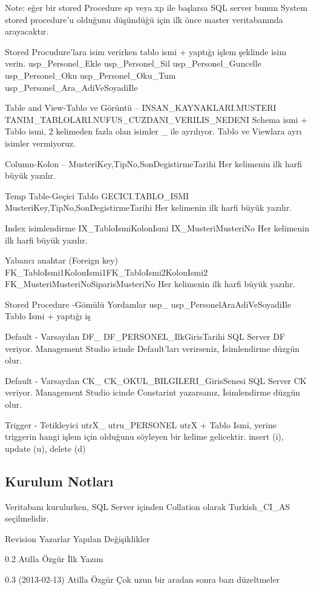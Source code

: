 \documentclass[10pt,a4paper,draft]{article}
\begin{document}
  
  Note: eğer bir 
  stored Procedure sp veya xp ile başlarsa SQL server 			bunun System stored 
  procedure'u olduğunu düşündüğü için ilk önce master veritabanında arayacaktır. 
  
  
  Stored Procudure'lara isim verirken tablo ismi + yaptığı işlem şeklinde 
  isim verin.
		usp\_Personel\_Ekle			usp\_Personel\_Sil			 
		usp\_Personel\_Guncelle		usp\_Personel\_Oku			 
		usp\_Personel\_Oku\_Tum		usp\_Personel\_Ara\_AdiVeSoyadiIle
  
     Table and View-Tablo ve Görüntü 
     -- 
    INSAN\_KAYNAKLARI.MUSTERI 
      			TANIM\_TABLOLARI.NUFUS\_CUZDANI\_VERILIS\_NEDENI 
    Schema ismi + Tablo ismi, 2 kelimeden fazla olan isimler \_ ile 
      ayrılıyor. Tablo ve Viewlara ayrı isimler vermiyoruz.		  
  
     Column-Kolon 
     -- 
    MusteriKey,TipNo,SonDegistirmeTarihi 
    Her kelimenin ilk harfi büyük yazılır. 
  
     Temp Table-Geçici Tablo 
     GECICI.TABLO\_ISMI 
    MusteriKey,TipNo,SonDegistirmeTarihi 
    Her kelimenin ilk harfi büyük yazılır. 
  
     Index isimlendirme 
     IX\_TabloIsmiKolonIsmi 
     IX\_MusteriMusteriNo 
    Her kelimenin ilk harfi büyük yazılır. 
  
     Yabancı anahtar (Foreign key) 
     FK\_TabloIsmi1KolonIsmi1FK\_TabloIsmi2KolonIsmi2 
     FK\_MusteriMusteriNoSiparisMusteriNo 
    Her kelimenin ilk harfi büyük yazılır. 
  
     Stored Procedure -Gömülü Yordamlar 
     usp\_ 
     usp\_PersonelAraAdiVeSoyadiIle 
     Tablo Ismi + yaptığı iş 		  
  
    Default - Varsayılan 
     DF\_ 
     DF\_PERSONEL\_IlkGirisTarihi 
     SQL Server DF veriyor. Management Studio icinde Default'ları 
      verirseniz, İsimlendirme düzgün olur. 		  
  
     Default - Varsayılan 
     CK\_ 
     CK\_OKUL\_BILGILERI\_GirisSenesi 
     SQL Server CK veriyor. Management Studio icinde Constarint 
      yazarsanız, İsimlendirme düzgün olur. 				 
  
     Trigger - Tetikleyici 
     utrX\_ 
     utru\_PERSONEL 
      utrX + Tablo Ismi, yerine triggerin hangi işlem için olduğunu 
      söyleyen bir kelime gelicektir. insert (i), update (u), delete (d)
  
\subsection{Kurulum Notları}
Veritabanı kurulurken, SQL Server içinden Collation olarak Turkish\_CI\_AS 
seçilmelidir. 
  
      
      
Revision 
Yazarlar 
Yapılan Değişiklikler 
  
     0.2  
     Atilla Özgür 
    İlk Yazım 
    
  
     0.3 (2013-02-13) 
     Atilla Özgür 
    Çok uzun bir aradan sonra bazı düzeltmeler 
    
    
\end{document}
